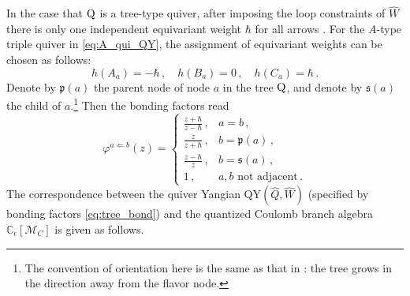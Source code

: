 \documentclass[12pt,a4paper]{article}
\newcommand{\eps}{\epsilon}
\begin{document}
In the case that $\rm Q$ is a tree-type quiver, after imposing the loop constraints of $\hat W$ there is  only one independent equivariant weight $\hbar$ for all arrows \cite{ChenLi2026}. For the $A$-type triple quiver in \eqref{eq:A_qui_QY}, the assignment of equivariant weights can be chosen as follows:
\begin{equation}
    h(A_a)=-\hbar\,,\quad h(B_a)=0\,,\quad h(C_a)=\hbar\,.
\end{equation}
Denote by $\mathfrak p(a)$ the parent node of node $a$ in the tree $\rm Q$, and denote by $\mathfrak{s}(a)$ the child of $a$.\footnote{The convention of orientation here is the same as that in \cite{ChenLi2026}: the tree grows in the direction away from the flavor node.} Then the bonding factors read
\begin{equation}\label{eq:tree_bond}
\varphi^{a\Leftarrow b}(z)=\left\{
\begin{array}{cc}
\frac{z+\hbar}{z-\hbar} \,,  &a=b\,,  \\
\frac{z}{z+\hbar} \,, & b=\mathfrak{p}(a)\,,\\
\frac{z-\hbar}{z}\,,& b= \mathfrak{s}(a)\,,\\
1\,,&a,b\text{ not adjacent}\,.
\end{array}\right.
\end{equation}
The correspondence between the quiver Yangian QY$(\hat{Q},\hat W)$ (specified by bonding factors \eqref{eq:tree_bond}) and the quantized Coulomb branch algebra $\mathbb C_\eps[\mathcal M_C]$ is given as follows.
\end{document}
